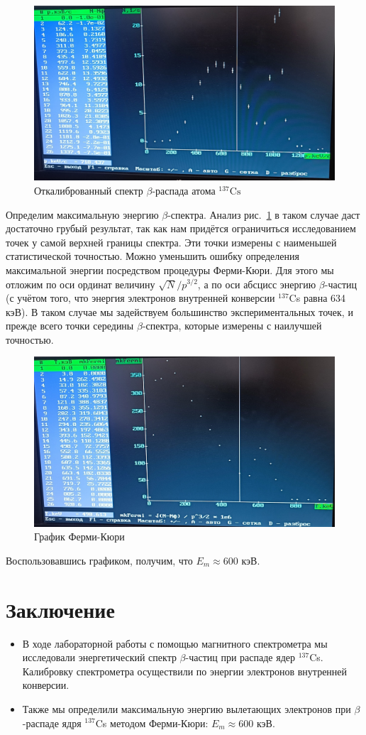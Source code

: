 \documentclass[a4paper, 12pt]{article}
\newcommand{\elem}[3]{{}^{#2}_{#3}\text{#1}}
\newcommand{\Cs}{\elem{Cs}{137}{}}
\begin{document}
    \begin{figure}[H]
        \centering
        \includegraphics[width=0.5\linewidth]{images/calibrated_spectrum.jpg}
        \caption{Откалиброванный спектр $\beta$-распада атома $\Cs$}
        \label{fig:calibrated_spectrum}
    \end{figure}
		 
    Определим максимальную энергию $\beta$-спектра. Анализ рис.~\ref{fig:calibrated_spectrum} в таком случае даст достаточно грубый результат, так как нам придётся ограничиться исследованием точек у самой верхней границы спектра. Эти точки измерены с наименьшей статистической точностью. Можно уменьшить ошибку определения максимальной энергии посредством процедуры Ферми-Кюри. Для этого мы отложим по оси ординат величину $\sqrt{N}/p^{3/2}$, а по оси абсцисс энергию $\beta$-частиц (с учётом того, что энергия электронов внутренней конверсии $^{137}$Cs равна 634 кэВ). В таком случае мы задействуем большинство экспериментальных точек, и прежде всего точки середины $\beta$-спектра, которые измерены с наилучшей точностью.

    \begin{figure}[H]
        \centering
        \includegraphics[width = 0.5\linewidth]{images/fermi_curie.jpg}
        \caption{График Ферми-Кюри}
        \label{fig:fermi-curie}
    \end{figure}
		
	Воспользовавшись графиком, получим, что $E_m \approx 600 \text{ кэВ}.$
    
    \section{Заключение}
    
    \begin{itemize}
       \item В ходе лабораторной работы с помощью магнитного спектрометра мы исследовали энергетический спектр $\beta$-частиц при распаде ядер $^{137}$Cs. Калибровку спектрометра осуществили по энергии электронов внутренней конверсии.
	
        \item Также мы определили максимальную энергию вылетающих электронов при $\beta$-распаде ядря $^{137}$Cs методом Ферми-Кюри: $E_m \approx 600$ кэВ.
    \end{itemize}
    
\end{document}
